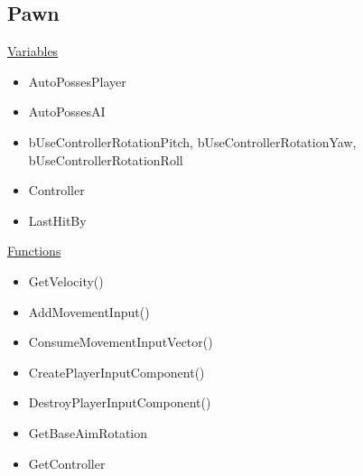         \subsection{Pawn}
            \uline{Variables}
            \begin{itemize}
                \item AutoPossesPlayer
                \item AutoPossesAI
                \item bUseControllerRotationPitch, bUseControllerRotationYaw, bUseControllerRotationRoll
                \item Controller
                \item LastHitBy
            \end{itemize}
\smallskip
            \uline{Functions}
            \begin{itemize}
                \item GetVelocity()
                \item AddMovementInput()
                \item ConsumeMovementInputVector()
                \item CreatePlayerInputComponent()
                \item DestroyPlayerInputComponent()
                \item GetBaseAimRotation
                \item GetController
            \end{itemize}
\smallskip

\smallskip
    
\smallskip

